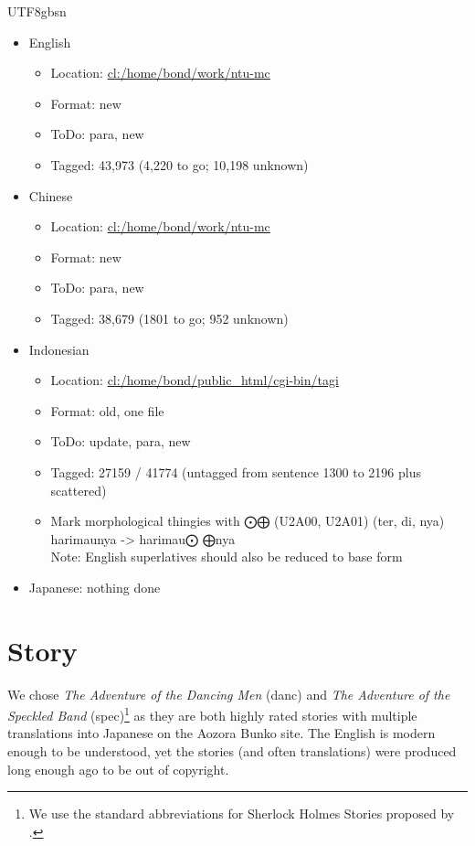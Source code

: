 \documentclass[12pt]{book} %
\begin{document}
\begin{CJK}{UTF8}{gbsn}
\begin{itemize}
\item English
  \begin{itemize}
  \item Location: \url{cl:/home/bond/work/ntu-mc}
  \item Format: new
  \item ToDo:  para, new
  \item Tagged: 43,973 (4,220 to go; 10,198 unknown)
  \end{itemize}
\item Chinese
  \begin{itemize}
  \item Location: \url{cl:/home/bond/work/ntu-mc}
  \item Format: new
  \item ToDo:  para, new
  \item Tagged: 38,679 (1801 to go; 952 unknown)
  \end{itemize}
\item Indonesian
  \begin{itemize}
  \item Location: \url{cl:/home/bond/public_html/cgi-bin/tagi}
  \item Format: old, one file
  \item ToDo: update, para, new
  \item Tagged: 27159 / 41774 (untagged from sentence 1300 to 2196 plus scattered)
  \item  Mark morphological thingies with ⨀⨁ (U2A00, U2A01) (ter, di, nya)
 \\ harimaunya -> harimau⨀ ⨁nya 
\\ Note: English superlatives should also be reduced to base form
  \end{itemize}
\item Japanese: nothing done 
\end{itemize}


\section{Story}

We chose \textit{The Adventure of the Dancing Men} (danc) and
\textit{The Adventure of the Speckled Band} (spec)\footnote{We use the
  standard abbreviations for Sherlock Holmes Stories proposed by
  \citet{Christ:1947}.}  as they are both highly rated stories with
multiple translations into Japanese on the Aozora Bunko site.  The
English is modern enough to be understood, yet the stories (and often
translations) were produced long enough ago to be out of copyright.



\end{CJK}
\end{document}

